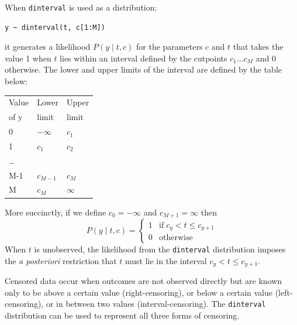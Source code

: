 \documentclass[11pt, a4paper, titlepage]{report}
\begin{document}
{When \texttt{dinterval} is used as a distribution:
\begin{verbatim}
y ~ dinterval(t, c[1:M])
\end{verbatim}
it generates a likelihood $P(y \mid t, c)$ for the parameters $c$ and
$t$ that takes the value 1 when $t$ lies within an interval defined by
the cutpoints $c_1 \ldots c_M$ and 0 otherwise. The lower and upper
limits of the interval are defined by the table below:

\begin{center}
\begin{tabular}{lll}
  \hline
  Value   & Lower     & Upper   \\
  of y    & limit     & limit   \\
  \hline
  0       & $-\infty$ & $c_1$     \\
  1       & $c_1$     & $c_2$     \\
  \ldots  &           &         \\
  M-1     & $c_{M-1}$  & $c_M$     \\
  M       & $c_{M}$   & $\infty$ \\
  \hline
\end{tabular}
\end{center}

More succinctly, if we define $c_0 = -\infty$ and $c_{M+1} = \infty$ then
\[
P(y \mid t, c) = \left\{
\begin{array}{cl}
  1 & \mbox{if} \; c_{y} < t \leq c_{y+1} \\
  0 & \mbox{otherwise}
\end{array}
\right.
\]
When $t$ is unobserved, the likelihood from the \texttt{dinterval}
distribution imposes the {\em a posteriori} restriction that $t$ must
lie in the interval $c_{y} < t \leq c_{y+1}$.

Censored data occur when outcomes are not observed directly but are
known only to be above a certain value (right-censoring), or below a
certain value (left-censoring), or in between two values
(interval-censoring). The \texttt{dinterval} distribution can be used
to represent all three forms of censoring.

}
\end{document}

